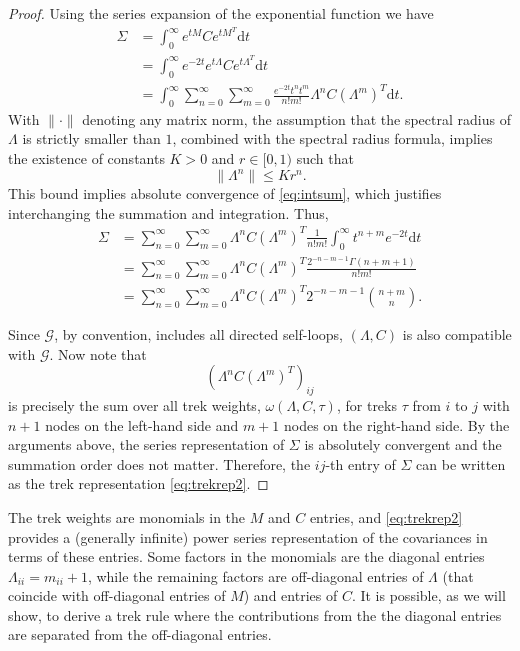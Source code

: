 \documentclass[10pt,twoside,a4paper]{amsart}
\begin{document}
\begin{proof} Using the series expansion of the exponential 
    function we have
    \begin{align}
        \Sigma & = 
        \int_0^{\infty} e^{tM} C e^{tM^T} \mathrm{d} t \nonumber \\
        & = \int_0^{\infty} e^{-2t} e^{t\Lambda} C e^{t\Lambda^T} \mathrm{d} t \nonumber \\
        & = \int_0^{\infty} 
        \sum_{n=0}^{\infty} \sum_{m=0}^{\infty}                           
        \frac{e^{-2t} t^n t^m}{n!m!} \Lambda^n
                                  C (\Lambda^m)^T \mathrm{d} t. \label{eq:intsum}
    \end{align}
    With $\| \cdot\|$ denoting any matrix norm, the assumption that 
    the spectral radius of $\Lambda$ is strictly smaller than $1$, combined with 
    the spectral radius formula, implies the existence of constants $K > 0$ and $r \in [0, 1)$ such that
    \[
        \| \Lambda^n \| \leq K  r^n.
    \]
    This bound implies absolute convergence of \eqref{eq:intsum}, which justifies interchanging the summation and integration. Thus, 
    \begin{align*}
       \Sigma & = 
       \sum_{n=0}^{\infty} \sum_{m=0}^{\infty}  \Lambda^n
       C (\Lambda^m)^T \frac{1}{n!m!} \int_0^{\infty} t^{n + m} e^{-2t}\mathrm{d} t \\
        & =  
        \sum_{n=0}^{\infty} \sum_{m=0}^{\infty}  \Lambda^n
        C (\Lambda^m)^T \frac{2^{- n - m - 1}\Gamma(n + m + 1)}{n!m!}
        \\
        & =  
        \sum_{n=0}^{\infty} \sum_{m=0}^{\infty}  \Lambda^n
        C (\Lambda^m)^T  2^{- n - m - 1} {n + m \choose n}.
        \end{align*}

Since $\mathcal{G}$, by convention, includes all directed self-loops,
$(\Lambda, C)$ is also compatible with $\mathcal{G}$. Now note that 
$$(\Lambda^n C (\Lambda^m)^T)_{ij}$$
is precisely the sum over all trek weights, 
$\omega(\Lambda, C, \tau)$,
for treks $\tau$ from $i$ to $j$ with $n + 1$ nodes on the left-hand side   and 
$m + 1$ nodes on the right-hand side. By the arguments above, the series representation 
of $\Sigma$ is absolutely convergent and the summation order does not matter. 
Therefore, the $ij$-th entry of $\Sigma$ can be written as the trek representation \eqref{eq:trekrep2}.
\end{proof}

The trek weights are monomials in the $M$ and $C$ entries,
and \eqref{eq:trekrep2} provides a (generally infinite) power series representation 
of the covariances in terms of these entries. Some factors in the monomials 
are the diagonal entries $\Lambda_{ii} = m_{ii} + 1$, while the remaining 
factors are off-diagonal entries of $\Lambda$ (that coincide 
with off-diagonal entries of $M$) and entries of $C$. It is possible, 
as we will show, to derive a trek rule where the contributions from the 
the diagonal entries are separated from the off-diagonal entries.
\end{document}
